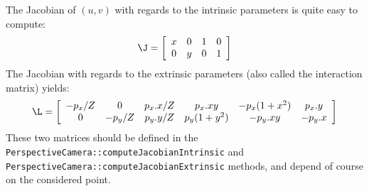 \documentclass{ecnreport}
\begin{document}
The Jacobian of $(u,v)$ with regards to the intrinsic parameters is quite easy to compute:
\begin{equation}
 \J = \left[\begin{array}{cccc}
	    x & 0 & 1 & 0\\ 
	    0 & y & 0 & 1
            \end{array}\right]
\end{equation}
The Jacobian with regards to the extrinsic parameters (also called the interaction matrix) yields:
\begin{equation}
 \L =    \left[\begin{array}{cccccc}
-p_x/Z & 0 & p_x.x/Z & p_x.xy & -p_x(1+x^2) & p_x.y \\
0 & -p_y/Z & p_y.y/Z & p_y(1+y^2) & -p_y.xy & -p_y.x
\end{array}\right]            
\end{equation}
These two matrices should be defined in the \texttt{PerspectiveCamera::computeJacobianIntrinsic} and \texttt{PerspectiveCamera::computeJacobianExtrinsic}
methods, and depend of course on the considered point.
\end{document}
